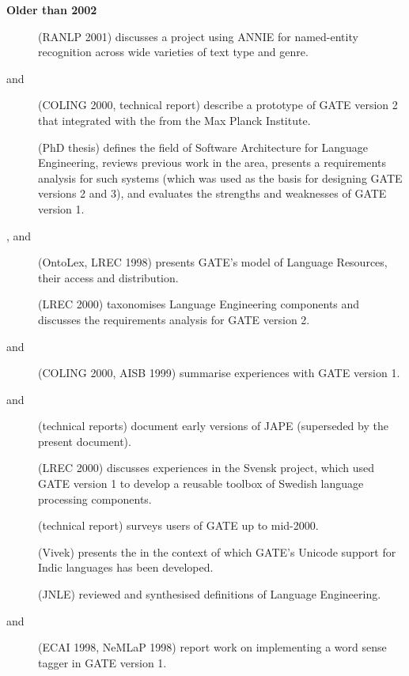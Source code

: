 \ifprintedbook 
\else
\textbf{Older than 2002}

\begin{description}

\item[\cite{May01}] (RANLP 2001)
discusses a project using ANNIE for named-entity recognition across wide
varieties of text type and genre.
%
\item[\cite{Bon00a} and \cite{Bru99a}] (COLING 2000, technical report)
describe a prototype of GATE version 2 that integrated with the
 from the Max Planck Institute.
%
\item[\cite{Cun00a}] (PhD thesis)
defines the field of Software Architecture for Language Engineering,
reviews previous work in the area, presents a requirements analysis for such
systems (which was used as the basis for designing GATE versions 2 and 3),
and evaluates the strengths and weaknesses of GATE version 1.
%
\item[\cite{Cun00d}, \cite{Cun98a} and \cite{Pet98a}]
(OntoLex, LREC 1998)
presents GATE's model of Language Resources, their access and distribution.
%
\item[\cite{Cun00b}] (LREC 2000)
taxonomises Language Engineering components and discusses the requirements
analysis for GATE version 2.
%
\item[\cite{Cun00c} and \cite{Cun99a}] (COLING 2000, AISB 1999)
summarise experiences with GATE version 1.
%
\item[\cite{Cun00e} and \cite{Cun99d}] (technical reports)
document early versions of JAPE (superseded by the present document).
%
\item[\cite{Gamback00}] (LREC 2000)
discusses experiences in the Svensk project, which used GATE version 1
to develop a reusable toolbox of Swedish language processing components.
%
\item[\cite{May00a}] (technical report)
surveys users of GATE up to mid-2000.
%
\item[\cite{McE00}] (Vivek)
presents the
in the context of which
GATE's Unicode support for Indic languages has been developed.
%
\item[\cite{Cun99b}] (JNLE)
reviewed and synthesised definitions of Language Engineering.
%
\item[\cite{Ste98} and \cite{Cun98}] (ECAI 1998, NeMLaP 1998)
report work on implementing a word sense tagger in GATE version 1.

\end{description}
